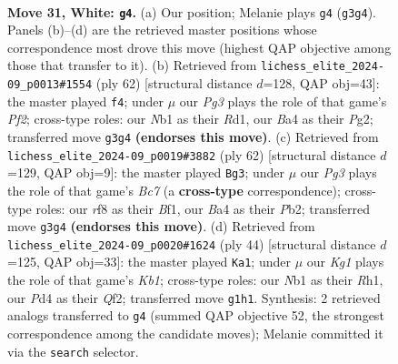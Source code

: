 \documentclass[11pt]{article}
\begin{document}
\begin{figure}[p]
\label{fig:thought-m58}
\end{figure}

\clearpage

\begin{figure}[p]\centering
\begin{subfigure}{0.46\textwidth}\centering
\resizebox{\linewidth}{!}{%
\newchessgame
\chessboard[
  setfen={r1bq1r2/pp3pbk/n3pnp1/P2p2Bp/B2P3P/1P4P1/R1PNQP2/1N2R1K1 w - - 1 31},
  showmover=false,
  pgfstyle=straightmove, color=movearrow, markmove={g3-g4}
]}
\caption{}
\end{subfigure}\hfill
\begin{subfigure}{0.46\textwidth}\centering
\resizebox{\linewidth}{!}{%
\newchessgame
\chessboard[
  setfen={2r1r3/1bq2pkp/p1pp1np1/Pp2n1Q1/1P2P3/1N1B3P/2PN1PP1/3RR1K1 w - - 4 32},
  showmover=false,
  pgfstyle=straightmove, color=movearrow, markmove={f2-f4}
]}
\caption{}
\end{subfigure}
\\[4pt]
\begin{subfigure}{0.46\textwidth}\centering
\resizebox{\linewidth}{!}{%
\newchessgame
\chessboard[
  setfen={r3rnk1/qpB1bpp1/2p1pnbp/8/p1PP4/P1N1RN1P/1P1R1PP1/3Q1BK1 w - - 30 32},
  showmover=false,
  pgfstyle=straightmove, color=movearrow, markmove={c7-g3}
]}
\caption{}
\end{subfigure}\hfill
\begin{subfigure}{0.46\textwidth}\centering
\resizebox{\linewidth}{!}{%
\newchessgame
\chessboard[
  setfen={1knr4/1pprb2b/p1n4q/3P2p1/N1P2p1p/1P1N1P2/PB2BQ1P/1K1R3R w - - 1 23},
  showmover=false,
  pgfstyle=straightmove, color=movearrow, markmove={b1-a1}
]}
\caption{}
\end{subfigure}
\caption{\textbf{Move 31, White: \texttt{g4}.} (a) Our position; Melanie plays \texttt{g4} (\texttt{g3g4}). Panels (b)--(d) are the retrieved master positions whose correspondence most drove this move (highest QAP objective among those that transfer to it). (b) Retrieved from \texttt{lichess\_elite\_2024-09\_p0013\#1554} (ply 62) [structural distance $d$=128, QAP obj=43]: the master played \texttt{f4}; under $\mu$ our \emph{Pg3} plays the role of that game's \emph{Pf2}; cross-type roles: our \emph{N}b1 as their \emph{R}d1, our \emph{B}a4 as their \emph{P}g2; transferred move \texttt{g3g4} \textbf{(endorses this move)}. (c) Retrieved from \texttt{lichess\_elite\_2024-09\_p0019\#3882} (ply 62) [structural distance $d$=129, QAP obj=9]: the master played \texttt{Bg3}; under $\mu$ our \emph{Pg3} plays the role of that game's \emph{Bc7} (a \textbf{cross-type} correspondence); cross-type roles: our \emph{r}f8 as their \emph{B}f1, our \emph{B}a4 as their \emph{P}b2; transferred move \texttt{g3g4} \textbf{(endorses this move)}. (d) Retrieved from \texttt{lichess\_elite\_2024-09\_p0020\#1624} (ply 44) [structural distance $d$=125, QAP obj=33]: the master played \texttt{Ka1}; under $\mu$ our \emph{Kg1} plays the role of that game's \emph{Kb1}; cross-type roles: our \emph{N}b1 as their \emph{R}h1, our \emph{P}d4 as their \emph{Q}f2; transferred move \texttt{g1h1}. Synthesis: 2 retrieved analogs transferred to \texttt{g4} (summed QAP objective 52, the strongest correspondence among the candidate moves); Melanie committed it via the \texttt{search} selector.}

\end{figure}
\end{document}
